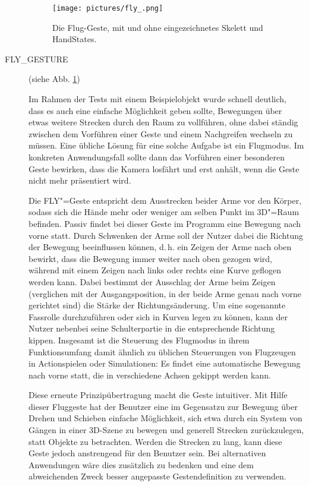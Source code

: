 \begin{description}
		\par
		\begin{figure}[H]
		\centering
		\texttt{[image: pictures/fly\_.png]}
		\caption{Die Flug-Geste, mit und ohne eingezeichnetes Skelett und HandStates.}\label{fig:flyg}
		\end{figure}
		\item[FLY\_GESTURE] (siehe Abb. \ref{fig:flyg})\par
		Im Rahmen der Tests mit einem Beispielobjekt wurde schnell deutlich, dass es auch eine einfache Möglichkeit geben sollte, Bewegungen über etwas weitere Strecken durch den Raum zu vollführen, ohne dabei ständig zwischen dem Vorführen einer Geste und einem \glqq Nachgreifen\grqq{} wechseln zu müssen. Eine übliche Lösung für eine solche Aufgabe ist ein Flugmodus. Im konkreten Anwendungsfall sollte dann das Vorführen einer besonderen Geste bewirken, dass die Kamera losfährt und erst anhält, wenn die Geste nicht mehr präsentiert wird.\par 
		Die FLY"=Geste entspricht dem Ausstrecken beider Arme vor den Körper, sodass sich die Hände mehr oder weniger am selben Punkt im 3D"=Raum befinden. Passiv findet bei dieser Geste im Programm eine Bewegung nach vorne statt. Durch Schwenken der Arme soll der Nutzer dabei die Richtung der Bewegung beeinflussen können, d.\,h. ein Zeigen der Arme nach oben bewirkt, dass die Bewegung immer weiter nach oben gezogen wird, während mit einem Zeigen nach links oder rechts eine Kurve geflogen werden kann. Dabei bestimmt der Ausschlag der Arme beim Zeigen (verglichen mit der Ausgangsposition, in der beide Arme genau nach vorne gerichtet sind) die Stärke der Richtungsänderung. Um eine sogenannte Fassrolle durchzuführen oder sich \glqq{}in Kurven legen\grqq{} zu können, kann der Nutzer nebenbei seine Schulterpartie in die entsprechende Richtung kippen. Insgesamt ist die Steuerung des Flugmodus in ihrem Funktionsumfang damit ähnlich zu üblichen Steuerungen von Flugzeugen in Actionspielen oder Simulationen: Es findet eine automatische Bewegung nach vorne statt, die in verschiedene Achsen gekippt werden kann.\par
	Diese erneute Prinzipübertragung macht die Geste intuitiver. Mit Hilfe dieser Fluggeste hat der Benutzer eine im Gegensatzu zur Bewegung über Drehen und Schieben einfache Möglichkeit, sich etwa durch ein System von Gängen in einer 3D-Szene zu bewegen und generell Strecken zurückzulegen, statt Objekte zu betrachten. Werden die Strecken zu lang, kann diese Geste jedoch anstrengend für den Benutzer sein. Bei alternativen Anwendungen wäre dies zusätzlich zu bedenken und eine dem abweichenden Zweck besser angepasste Gestendefinition zu verwenden.

\end{description}
